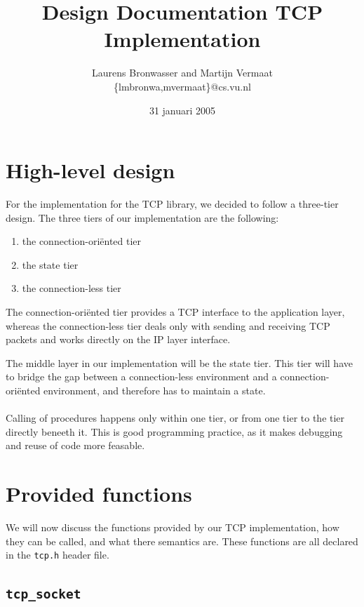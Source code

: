 \documentclass[11pt]{article}
\title{Design Documentation TCP Implementation}
\author{
    Laurens Bronwasser and Martijn Vermaat\\
    \{lmbronwa,mvermaat\}@cs.vu.nl
}
\date{31 januari 2005}
\begin{document}
\maketitle


\lstset{
  numbers=none,
  basicstyle=\small,
  frame=tb,
  language=C,
  captionpos=b
}


\section{High-level design}

For the implementation for the TCP library, we decided to follow a three-tier
design. The three tiers of our implementation are the following:

\begin{enumerate}
\item the connection-ori\"ented tier
\item the state tier
\item the connection-less tier
\end{enumerate}

The connection-ori\"ented tier provides a TCP interface to the application
layer, whereas the connection-less tier deals only with sending and
receiving TCP packets and works directly on the IP layer interface.

The middle layer in our implementation will be the state tier. This tier
will have to bridge the gap between a connection-less environment and a
connection-ori\"ented environment, and therefore has to maintain a state.

\paragraph{}

Calling of procedures happens only within one tier, or from one tier to
the tier directly beneeth it. This is good programming practice, as it makes
debugging and reuse of code more feasable.


\section{Provided functions}

We will now discuss the functions provided by our TCP implementation, how they
can be called, and what there semantics are. These functions are all declared in
the \lstinline|tcp.h| header file.


\subsection{\lstinline{tcp_socket}}
\end{document}
